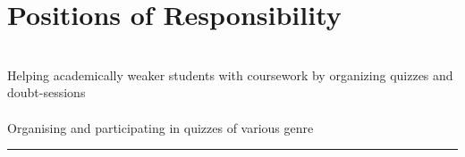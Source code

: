 \documentclass[letterpaper]{Formatting}
\begin{document}
\begin{minipage}[t]{0.3\textwidth}

\section{Positions of Responsibility}
\\
\vspace{1ex}
\footnotesize \textbullet{} Helping academically weaker students with coursework by organizing quizzes and doubt-sessions\\
\vspace{3ex}
\\
\vspace{1ex}
\footnotesize \textbullet{} Organising and participating in quizzes of various genre\\
\vspace{1ex}
\rule{5cm}{0.5pt}
\end{minipage} %
\hfill
\vrule
\hspace{3ex}
%
%
\end{document}
